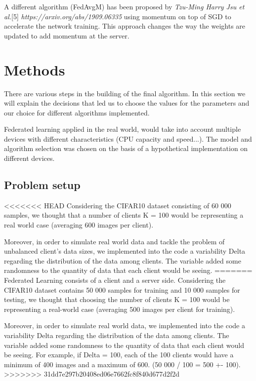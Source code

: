 \documentclass[twocolumn]{article}
\begin{document}
A different algorithm (FedAvgM) has been proposed by \emph{Tzu-Ming Harry Jsu et al.}[5] \emph{https://arxiv.org/abs/1909.06335} using momentum on top of SGD to accelerate the network training. This approach changes the way the weights are updated to add momentum at the server.

\section{Methods} %
There are various steps in the building of the final algorithm. In this section we will explain the decisions that led us to choose the values for the parameters and our choice for different algorithms implemented. 

Federated learning applied in the real world, would take into account multiple devices with different characteristics (CPU capacity and speed...). The model and algorithm selection was chosen on the basis of a hypothetical implementation on different devices.  

\subsection{Problem setup}
<<<<<<< HEAD
Considering the CIFAR10 dataset consisting of 60 000 samples, we thought that a number of clients K = 100 would be representing a real world case (averaging 600 images per client). 

Moreover, in order to simulate real world data and tackle the problem of unbalanced client's data sizes, we implemented into the code a variability Delta regarding the distribution of the data among clients. The variable added some randomness to the quantity of data that each client would be seeing. 
=======
Federated Learning consists of a client and a server side. Considering the CIFAR10 dataset contains 50 000 samples for training and 10 000 samples for testing, we thought that choosing the number of clients K = 100 would be representing a real-world case (averaging 500 images per client for training). 

Moreover, in order to simulate real world data, we implemented into the code a variability Delta regarding the distribution of the data among clients. The variable added some randomness to the quantity of data that each client would be seeing. For example, if Delta = 100, each of the 100 clients would have a minimum of 400 images and a maximum of 600. (50 000 / 100 = 500 +- 100).
>>>>>>> 31dd7e297b20408ed06e7662fc8f840d677d2f2d
\end{document}
